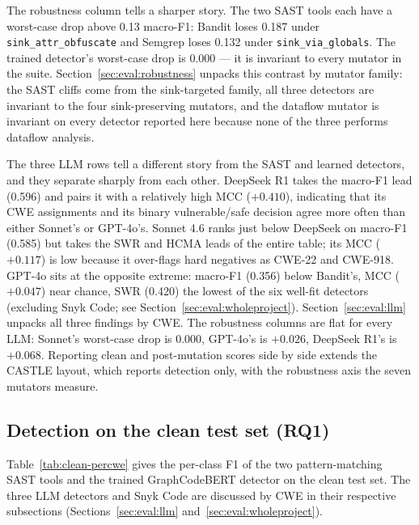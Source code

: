 The robustness column tells a sharper story. The two SAST tools
each have a worst-case drop above 0.13 macro-F1: Bandit loses 0.187
under \texttt{sink\_attr\_obfuscate} and Semgrep loses 0.132 under
\texttt{sink\_via\_globals}. The trained detector's worst-case drop
is $0.000$ — it is invariant to every mutator in the suite.
Section~\ref{sec:eval:robustness} unpacks this contrast by mutator
family: the SAST cliffs come from the sink-targeted family, all
three detectors are invariant to the four sink-preserving mutators,
and the dataflow mutator is invariant on every detector reported
here because none of the three performs dataflow analysis.

The three LLM rows tell a different story from the SAST and learned
detectors, and they separate sharply from each other. DeepSeek R1
takes the macro-F1 lead (0.596) and pairs it with a relatively high
MCC ($+0.410$), indicating that its CWE assignments and its
binary vulnerable/safe decision agree more often than either Sonnet's
or GPT-4o's. Sonnet 4.6 ranks just below DeepSeek on macro-F1 (0.585)
but takes the SWR and HCMA leads of the entire table; its MCC
($+0.117$) is low because it over-flags hard negatives as CWE-22 and
CWE-918. GPT-4o sits at the opposite extreme: macro-F1 (0.356) below
Bandit's, MCC ($+0.047$) near chance, SWR (0.420) the lowest of the
six well-fit detectors (excluding Snyk Code; see
Section~\ref{sec:eval:wholeproject}). Section~\ref{sec:eval:llm} unpacks all three
findings by CWE. The robustness columns are flat for every LLM:
Sonnet's worst-case drop is $0.000$, GPT-4o's is $+0.026$, DeepSeek
R1's is $+0.068$. Reporting clean and post-mutation scores side by
side extends the CASTLE layout, which reports detection only, with
the robustness axis the seven mutators measure.

\subsection{Detection on the clean test set (RQ1)}
\label{sec:eval:clean}

Table~\ref{tab:clean-percwe} gives the per-class F1 of the two
pattern-matching SAST tools and the trained GraphCodeBERT detector
on the clean test set. The three LLM detectors and Snyk Code are
discussed by CWE in their respective subsections
(Sections~\ref{sec:eval:llm} and~\ref{sec:eval:wholeproject}).

